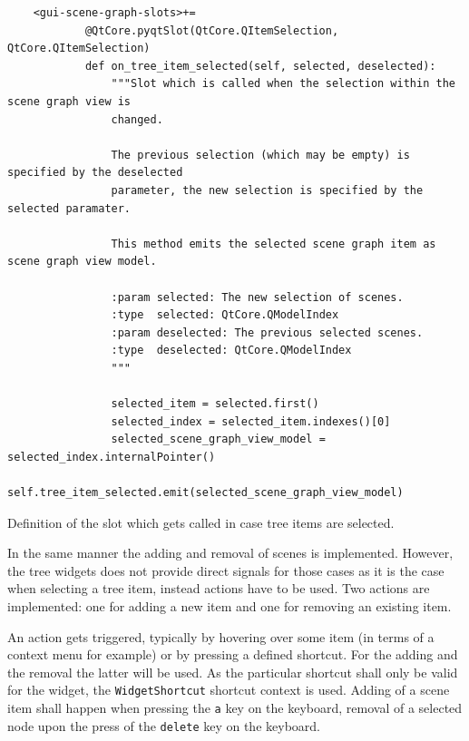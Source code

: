 \documentclass[10pt, openright, notitlepage]{scrreprt}
\begin{document}
\begin{listing}[H]
\begin{verbatim}
    <gui-scene-graph-slots>+=
            @QtCore.pyqtSlot(QtCore.QItemSelection, QtCore.QItemSelection)
            def on_tree_item_selected(self, selected, deselected):
                """Slot which is called when the selection within the scene graph view is
                changed.
            
                The previous selection (which may be empty) is specified by the deselected
                parameter, the new selection is specified by the selected paramater.
            
                This method emits the selected scene graph item as scene graph view model.
            
                :param selected: The new selection of scenes.
                :type  selected: QtCore.QModelIndex
                :param deselected: The previous selected scenes.
                :type  deselected: QtCore.QModelIndex
                """
            
                selected_item = selected.first()
                selected_index = selected_item.indexes()[0]
                selected_scene_graph_view_model = selected_index.internalPointer()
                self.tree_item_selected.emit(selected_scene_graph_view_model)
\end{verbatim}
\caption{\label{lst:gui-scene-graph-slots-01}
Definition of the slot which gets called in case tree items are selected.}
\end{listing}

In the same manner the adding and removal of scenes is implemented. However, the
tree widgets does not provide direct signals for those cases as it is the case
when selecting a tree item, instead actions have to be used. Two actions are
implemented: one for adding a new item and one for removing an existing item.

An action gets triggered, typically by hovering over some item (in terms of a
context menu for example) or by pressing a defined shortcut. For the adding and
the removal the latter will be used. As the particular shortcut shall only be
valid for the widget, the \texttt{WidgetShortcut} shortcut context is used.
Adding of a scene item shall happen when pressing the \texttt{a} key on the keyboard,
removal of a selected node upon the press of the \texttt{delete} key on the keyboard.
\end{document}
